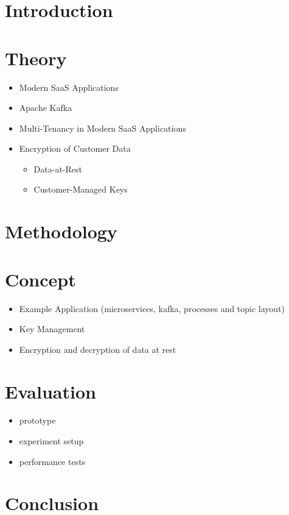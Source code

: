 
\section{Introduction}




\section{Theory}

\begin{itemize}
  \item Modern SaaS Applications
  \item Apache Kafka
  \item Multi-Tenancy in Modern SaaS Applications
  \item Encryption of Customer Data
        \begin{itemize}
          \item Data-at-Rest
          \item Customer-Managed Keys
        \end{itemize}
\end{itemize}

\section{Methodology}

\section{Concept}

\begin{itemize}
  \item Example Application (microservices, kafka, processes and topic layout)
  \item Key Management
  \item Encryption and decryption of data at rest
\end{itemize}

\section{Evaluation}

\begin{itemize}
  \item prototype
  \item experiment setup
  \item performance tests
\end{itemize}

\section{Conclusion}
